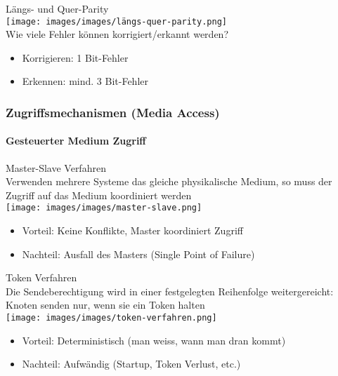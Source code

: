 \begin{concept}{Längs- und Quer-Parity}\\
        \texttt{[image: images/images/längs-quer-parity.png]}\\
    Wie viele Fehler können korrigiert/erkannt werden?
    \begin{itemize}
        \item Korrigieren: 1 Bit-Fehler
        \item Erkennen: mind. 3 Bit-Fehler
    \end{itemize}
\end{concept}



\subsubsection{Zugriffsmechanismen (Media Access)}

\paragraph{Gesteuerter Medium Zugriff}

\begin{definition}{Master-Slave Verfahren}\\
    Verwenden mehrere Systeme das gleiche physikalische Medium, so muss der Zugriff auf das Medium koordiniert werden\\
        \texttt{[image: images/images/master-slave.png]}
    \begin{itemize}
        \item Vorteil: Keine Konflikte, Master koordiniert Zugriff
        \item Nachteil: Ausfall des Masters (Single Point of Failure)
    \end{itemize}
\end{definition}

\begin{definition}{Token Verfahren}\\
    Die Sendeberechtigung wird in einer festgelegten Reihenfolge weitergereicht: Knoten senden nur, wenn sie ein Token halten\\
        \texttt{[image: images/images/token-verfahren.png]}
    \begin{itemize}
        \item Vorteil:  Deterministisch (man weiss, wann man dran kommt)
        \item Nachteil: Aufwändig (Startup, Token Verlust, etc.)
    \end{itemize}
\end{definition}

